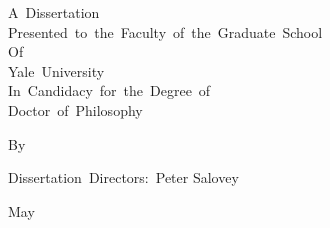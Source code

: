 \begin{titlepage}
	\begin{center}
		
		\DissertationTitle{}
		\par\vfill
		A~Dissertation\\
		Presented~to~the~Faculty~of~the~Graduate~School\\
		Of\\
		Yale~University\\
		In~Candidacy~for~the~Degree~of\\
		Doctor~of~Philosophy
		\par\vfill
		By\\
		\AuthorName{}
		\par\vspace{1.5em}
		Dissertation~Directors:~Peter Salovey
		\par\vspace{1.5em}
		May~\DissertationYear{}
		\vspace*{1cm}
		
%		
%		
%		
%		
%		
%		
%		
		
	\end{center}
\end{titlepage}